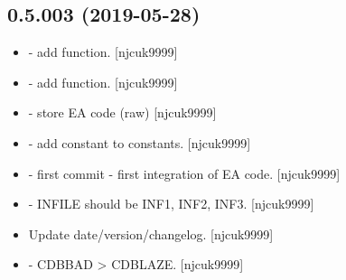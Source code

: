 \documentclass[a4paper,10pt,english]{report}
\begin{document}
\subsection{0.5.003 (2019-05-28)}
\label{\detokenize{misc/changelog:id133}}\begin{itemize}
\item {} 
 - add  function. {[}njcuk9999{]}

\item {} 
 - add  function. {[}njcuk9999{]}

\item {} 
 - store EA  code (raw) {[}njcuk9999{]}

\item {} 
 - add  constant to constants.
{[}njcuk9999{]}

\item {} 
 - first commit - first integration of EA
code. {[}njcuk9999{]}

\item {} 
 - INFILE should be INF1, INF2, INF3. {[}njcuk9999{]}

\item {} 
Update date/version/changelog. {[}njcuk9999{]}

\item {} 
 - CDBBAD \textendash{}\textgreater{} CDBLAZE. {[}njcuk9999{]}

\end{itemize}
\end{document}
